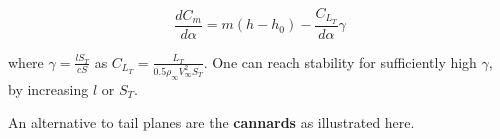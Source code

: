 	\begin{equation}
	\frac{dC_m}{d\alpha} = m(h-h_0) - \frac{C_{L_T}}{d\alpha} \gamma 
	\end{equation}
	
	where $\gamma = \frac{l S_T}{cS}$ as $C_{L_T} = \frac{L_T}{0.5\rho _\infty V_\infty ^2 S_T}$. One can reach stability for sufficiently high $\gamma$, by increasing $l$ or $S_T$. 
	
	An alternative to tail planes are the \textbf{cannards} as illustrated here. 